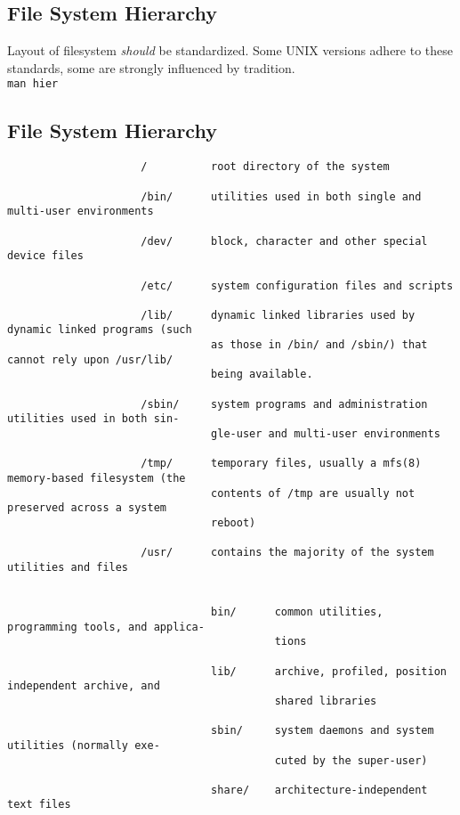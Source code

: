 \documentclass[xga]{xdvislides}
\begin{document}
\subsection{File System Hierarchy}
Layout of filesystem {\em should} be standardized.  Some UNIX versions adhere
to these standards, some are strongly influenced by tradition.
\\

{\tt man hier}

\subsection{File System Hierarchy}
\small
\begin{verbatim}
                     /          root directory of the system

                     /bin/      utilities used in both single and multi-user environments

                     /dev/      block, character and other special device files

                     /etc/      system configuration files and scripts

                     /lib/      dynamic linked libraries used by dynamic linked programs (such
                                as those in /bin/ and /sbin/) that cannot rely upon /usr/lib/
                                being available.

                     /sbin/     system programs and administration utilities used in both sin-
                                gle-user and multi-user environments

                     /tmp/      temporary files, usually a mfs(8) memory-based filesystem (the
                                contents of /tmp are usually not preserved across a system
                                reboot)

                     /usr/      contains the majority of the system utilities and files


                                bin/      common utilities, programming tools, and applica-
                                          tions

                                lib/      archive, profiled, position independent archive, and
                                          shared libraries

                                sbin/     system daemons and system utilities (normally exe-
                                          cuted by the super-user)

                                share/    architecture-independent text files
\end{verbatim}
\Normalsize
\end{document}
